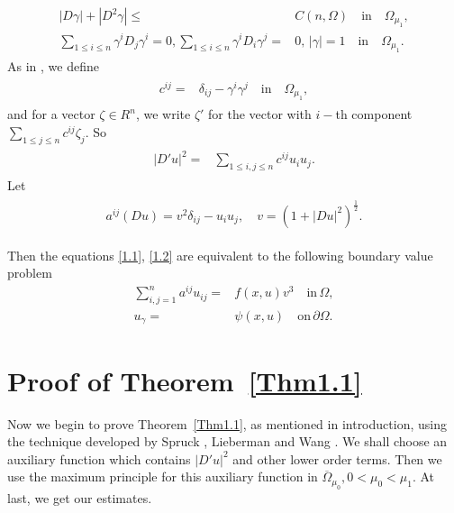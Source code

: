 \documentclass[11pt]{amsart}
\numberwithin{equation}{section}
\begin{document}
\begin{align}\label{2.1}
\begin{split}
|D\gamma|+|D^2\gamma|\leq& C(n,\Omega) \quad\text{in}\quad \Omega_{\mu_{1}},\\
 \sum_{1\leq i\leq n}\gamma^iD_j\gamma^i=0,  \sum_{1\leq i\leq n}\gamma^iD_i\gamma^j=&0, \,|\gamma|=1 \quad\text{in} \quad\Omega_{\mu_{1}}.
\end{split}
\end{align}
As in \cite{Lieb13}, we define
 \begin{align}\label{2.2}
\begin{split}
c^{ij}=&\delta_{ij}-\gamma^i\gamma^j  \quad \text{in} \quad \Omega_{\mu_{1}},
\end{split}
\end{align}
 and for a vector $\zeta \in R^n$, we write $\zeta'$ for the vector with $i-$th component $ \sum_{1\leq j\leq n}c^{ij}\zeta_j$. So
 \begin{align}\label{2.3}
\begin{split}
|D'u|^2=& \sum_{1\leq i,j\leq n}c^{ij}u_iu_j.
\end{split}
\end{align}
Let
\begin{align}\label{2.4}
\begin{split}
a^{ij}(D u)=v^2\delta_{ij}-u_iu_j, \quad
v=(1+|D u|^2)^{\frac{1}{2}}.
\end{split}
\end{align}

Then the equations \eqref{1.1}, \eqref{1.2} are equivalent to the following boundary value problem
\begin{align}\label{2.5}
\sum_{i,j=1}^n a^{ij}u_{ij}=&f(x,u)v^3 \quad \text{in}\,\Omega,\\
u_{\gamma}=& \psi(x, u) \quad \text{on}\,\partial\Omega.\label{2.6}
\end{align}


\section{Proof of Theorem~\ref{Thm1.1} }

Now we begin to prove Theorem~\ref{Thm1.1}, as  mentioned in introduction, using the technique developed by Spruck \cite{Sp75}, Lieberman \cite{Lieb88} and Wang \cite{Wang98}. We shall choose an auxiliary function which contains  $|D'u|^2$ and other lower order terms. Then we use the maximum principle for this auxiliary function in $\overline\Omega_{\mu_0}, 0<\mu_0<\mu_1$. At last,  we get our estimates.
\end{document}
